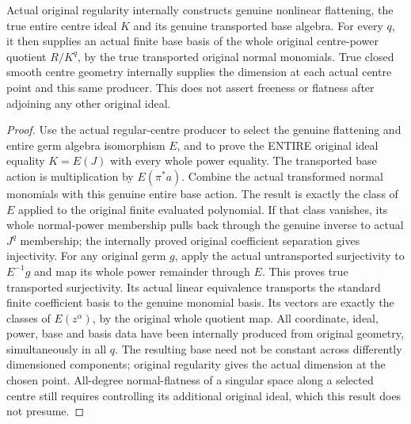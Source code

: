 \begin{theorem}
\label{hir:relative-normal-basis-actual-original-centre}
\leanok
Actual original regularity internally constructs genuine nonlinear flattening,
the true entire centre ideal $K$ and its genuine transported base algebra.
For every $q$, it then supplies an actual finite base basis of the whole
original centre-power quotient $R/K^q$, by the true transported original
normal monomials. True closed smooth centre geometry internally supplies the dimension at
each actual centre point and this same producer. This does not assert freeness
or flatness after adjoining any other original ideal.
\end{theorem}
\begin{proof}
Use the actual regular-centre producer to select the genuine flattening and
entire germ algebra isomorphism $E$, and to prove the ENTIRE original ideal
equality $K=E(J)$ with every whole power equality. The transported base action
is multiplication by $E(\pi^*a)$. Combine the actual transformed normal monomials with this genuine entire
base action. The result is exactly the class of $E$ applied to the original
finite evaluated polynomial. If that class vanishes, its whole normal-power
membership pulls back through the genuine inverse to actual $J^q$ membership;
the internally proved original coefficient separation gives injectivity.
For any original germ $g$, apply the actual untransported surjectivity to
$E^{-1}g$ and map its whole power remainder through $E$. This proves true
transported surjectivity. Its actual linear equivalence transports the
standard finite coefficient basis to the genuine monomial basis. Its vectors are exactly the classes of $E(z^\alpha)$, by the
original whole quotient map. All coordinate, ideal, power, base and basis data
have been internally produced from original geometry, simultaneously in all
$q$. The resulting base need not be constant across differently dimensioned
components; original regularity gives the actual dimension at the chosen
point. All-degree normal-flatness of a singular space along a selected centre
still requires controlling its additional original ideal, which this result
does not presume.
\end{proof}
